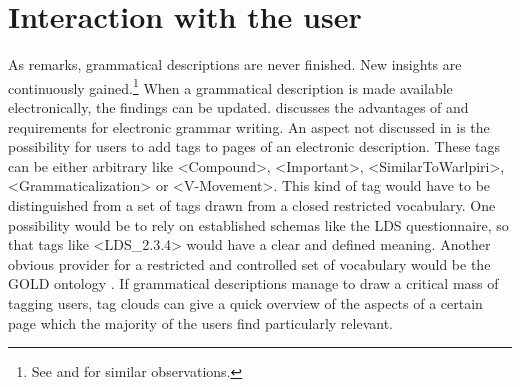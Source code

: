 \documentclass[a4paper,12pt]{article}
\begin{document}
\section{Interaction with the user}
As \citet{Weber2006grow} remarks, grammatical descriptions are never finished. New insights are continuously gained.\footnote{See \citet{Comrie1998,Cristofaro2006,Mosel2006craft,Payne2006,Rice2006} and \citet{Zaefferer2006} for similar observations.} When a grammatical description is made available electronically, the findings can be updated.   \citet{Nordhoff2008jldc} discusses the  advantages of  and requirements for electronic grammar writing. An aspect not discussed in \citet{Nordhoff2008jldc} is the possibility for users to add tags to pages of an electronic description. These tags can be either arbitrary like <Compound>, <Important>, <SimilarToWarlpiri>, <Grammaticalization> or <V-Movement>. This kind of tag would have to be distinguished from a set of tags drawn from a closed restricted vocabulary. One possibility would be to rely on established schemas like the LDS questionnaire, so that tags like <LDS\_2.3.4> would have a clear and defined meaning. Another obvious provider for a restricted and controlled set of vocabulary would be the GOLD ontology \citep{FarrarEtAl2003}. If grammatical descriptions manage to draw a critical mass of tagging users, tag clouds can give a quick overview of the aspects of a certain page which the majority of the users find particularly relevant.
\end{document}

